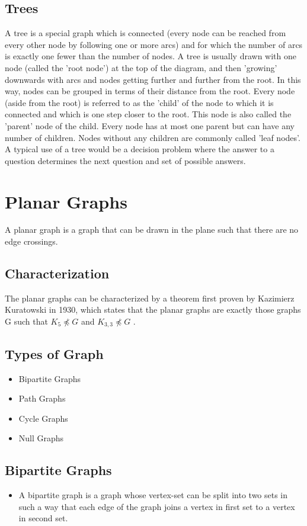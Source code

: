 \documentclass[]{report}
\begin{document}
\subsection{Trees}
A tree is a special graph which is connected (every node can be reached from every other node by following one or more arcs) and for which the number of arcs is exactly one fewer than the number of nodes. A tree is usually drawn with one node (called the 'root node') at the top of the diagram, and then 'growing' downwards with arcs and nodes getting further and further from the root. In this way, nodes can be grouped in terms of their distance from the root. Every node (aside from the root) is referred to as the 'child' of the node to which it is connected and which is one step closer to the root. This node is also called the 'parent' node of the child. Every node has at most one parent but can have any number of children. Nodes without any children are commonly called 'leaf nodes'. A typical use of a tree would be a decision problem where the answer to a question determines the next question and set of possible answers.
\section{Planar Graphs}
A planar graph is a graph that can be drawn in the plane such that there are no edge crossings.

\subsection{Characterization}
The planar graphs can be characterized by a theorem first proven by Kazimierz Kuratowski in 1930, which states that the planar graphs are exactly those graphs G such that $K_5 \not \preceq G$  and $K_{3,3} \not \preceq G$ .



\subsection{Types of Graph}
\begin{itemize}
\item Bipartite Graphs
\item Path Graphs
\item Cycle Graphs
\item Null Graphs
\end{itemize}

\subsection{Bipartite Graphs}
\begin{itemize}
\item A bipartite graph is a graph whose vertex-set can be split into two sets in such a way that each edge of the graph joins a vertex in first set to a vertex in second set.
\end{itemize}
\end{document}
